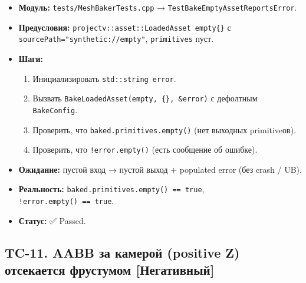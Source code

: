 \begin{itemize}
\tightlist
\item
  \textbf{Модуль:} \texttt{tests/MeshBakerTests.cpp} → \texttt{TestBakeEmptyAssetReportsError}.
\item
  \textbf{Предусловия:} \texttt{projectv::asset::LoadedAsset\ empty\{\}} с \texttt{sourcePath="synthetic://empty"}, \texttt{primitives} пуст.
\item
  \textbf{Шаги:}

  \begin{enumerate}
  \def\labelenumi{\arabic{enumi}.}
  \tightlist
  \item
    Инициализировать \texttt{std::string\ error}.
  \item
    Вызвать \texttt{BakeLoadedAsset(empty,\ \{\},\ \&error)} с дефолтным \texttt{BakeConfig}.
  \item
    Проверить, что \texttt{baked.primitives.empty()} (нет выходных primitive\textquotesingle ов).
  \item
    Проверить, что \texttt{!error.empty()} (есть сообщение об ошибке).
  \end{enumerate}
\item
  \textbf{Ожидание:} пустой вход → пустой выход + populated error (без crash / UB).
\item
  \textbf{Реальность:} \texttt{baked.primitives.empty()\ ==\ true}, \texttt{!error.empty()\ ==\ true}.
\item
  \textbf{Статус:} ✅ Passed.
\end{itemize}

\subsection{TC-11. AABB за камерой (positive Z) отсекается фрустумом {[}Негативный{]}}\label{KT-2.2_Test_Report-tc-11-aabb-ux437ux430-ux43aux430ux43cux435ux440ux43eux439-positive-z-ux43eux442ux441ux435ux43aux430ux435ux442ux441ux44f-ux444ux440ux443ux441ux442ux443ux43cux43eux43c-ux43dux435ux433ux430ux442ux438ux432ux43dux44bux439}

